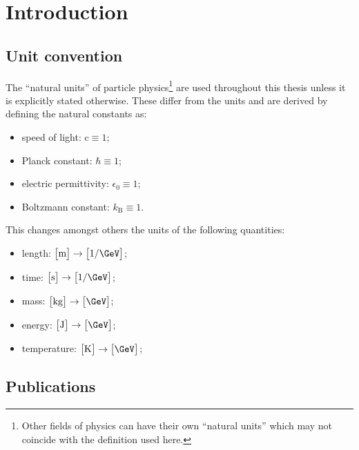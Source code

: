 \chapter{Introduction}

\section{Unit convention}

The ``natural units'' of particle physics\footnote{Other fields of physics can have their own ``natural units'' which may not coincide with the definition used here.} are used throughout this thesis unless it is explicitly stated otherwise. These differ from the  units and are derived by defining the natural constants as:

\begin{itemize}
\item speed of light: $\mathrm{c}\equiv 1$;
\item Planck constant: $\hbar\equiv 1$;
\item electric permittivity: $\epsilon_{0}\equiv 1$;
\item Boltzmann constant: $k_\mathrm{B}\equiv 1$.
\end{itemize}

This changes amongst others the units of the following quantities:

\begin{itemize}
\item length: $\big[\mathrm{m}\big]\rightarrow \big[1/\GeV\big]$;
\item time: $\big[\mathrm{s}\big]\rightarrow \big[1/\GeV\big]$;
\item mass: $\big[\mathrm{kg}\big]\rightarrow \big[\GeV\big]$;
\item energy: $\big[\mathrm{J}\big]\rightarrow \big[\GeV\big]$;
\item temperature: $\big[\mathrm{K}\big]\rightarrow \big[\GeV\big]$;
\end{itemize}


\section{Publications}

